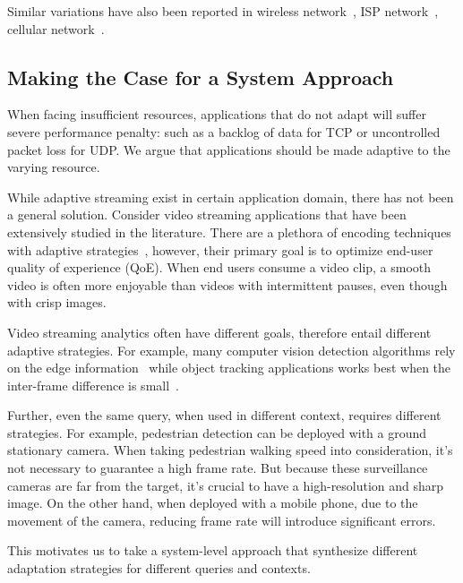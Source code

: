 Similar variations have also been reported in wireless
network~\cite{biswas2015large}, ISP network~\cite{grover2013peeking}, cellular
network~\cite{nikravesh2014mobile}.


\subsection{Making the Case for a System Approach}
\label{sec:bat}

When facing insufficient resources, applications that do not adapt will suffer
severe performance penalty: such as a backlog of data for TCP or uncontrolled
packet loss for UDP. We argue that applications should be made adaptive to the
varying resource.

While adaptive streaming exist in certain application domain, there has not been
a general solution. Consider video streaming applications that have been
extensively studied in the literature. There are a plethora of encoding
techniques~\cite{richardson2011h, grange2016vp9} with adaptive
strategies~\cite{yin2015control, michalos2012dynamic, pantos2016http}, however,
their primary goal is to optimize end-user quality of experience (QoE).  When
end users consume a video clip, a smooth video is often more enjoyable than
videos with intermittent pauses, even though with crisp images.

Video streaming analytics often have different goals, therefore entail different
adaptive strategies. For example, many computer vision detection algorithms rely
on the edge information~\cite{canny1986computational, lowe2004distinctive,
  viola2001rapid} while object tracking applications works best when the
inter-frame difference is small~\cite{allen2004object}.

Further, even the same query, when used in different context, requires different
strategies. For example, pedestrian detection can be deployed with a ground
stationary camera. When taking pedestrian walking speed into consideration, it's
not necessary to guarantee a high frame rate. But because these surveillance
cameras are far from the target, it's crucial to have a high-resolution and
sharp image. On the other hand, when deployed with a mobile phone, due to the
movement of the camera, reducing frame rate will introduce significant
errors.

This motivates us to take a system-level approach that synthesize different
adaptation strategies for different queries and contexts.


